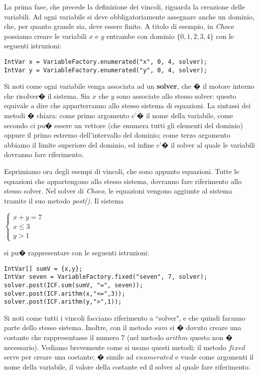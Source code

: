 La prima fase, che precede la definizione dei vincoli, riguarda la creazione delle variabili. Ad ogni variabile si deve obbligatoriamente assegnare anche un dominio, che, per quanto grande sia, deve essere finito. A titolo di esempio, in \emph{Choco} possiamo creare le variabili $x$ e $y$ entrambe con dominio $\{0,1,2,3,4\}$ con le seguenti istruzioni:\\
\begin{lstlisting}
IntVar x = VariableFactory.enumerated("x", 0, 4, solver);
IntVar y = VariableFactory.enumerated("y", 0, 4, solver);
\end{lstlisting}
Si noti come ogni variabile venga associata ad un \textbf{solver}, che � il motore interno che risolver� il sistema. Sia $x$ che $y$ sono associate allo stesso solver: questo equivale a dire che apparterranno allo stesso sistema di equazioni. La sintassi dei metodi � chiara: come primo argomento c'� il nome della variabile, come secondo ci pu� essere un vettore (che enumera tutti gli elementi del dominio) oppure il primo estremo dell'intervallo del dominio; come terzo argomento abbiamo il limite superiore del dominio, ed infine c'� il solver al quale le variabili dovranno fare riferimento.

Esprimiamo ora degli esempi di vincoli, che sono appunto equazioni. Tutte le equazioni che appartengono allo stesso sistema, dovranno fare riferimento allo stesso solver. Nel solver di \emph{Choco}, le equazioni vengono aggiunte al sistema tramite il suo metodo \emph{post()}. Il sistema \\
\begin{center}
$\begin{cases}
x+y=7 \\
x \le 3 \\
y > 1
\end{cases}$
\end{center}
si pu� rappresentare con le seguenti istruzioni:\\
\begin{lstlisting}
IntVar[] sumV = {x,y};
IntVar seven = VariableFactory.fixed("seven", 7, solver);
solver.post(ICF.sum(sumV, "=", seven));
solver.post(ICF.arithm(x,"<=",3));
solver.post(ICF.arithm(y,">",1));
\end{lstlisting}

Si noti come tutti i vincoli facciano riferimento a ``solver", e che quindi faranno parte dello stesso sistema. Inoltre, con il metodo $sum$ si � dovuto creare una costante che rappresentasse il numero 7 (nel metodo $arithm$ questo non � necessario). Vediamo brevemente come si usano questi metodi: il metodo $fixed$ serve per creare una costante; � simile ad $enumerated$ e vuole come argomenti il nome della variabile, il valore della costante ed il solver al quale fare riferimento.

